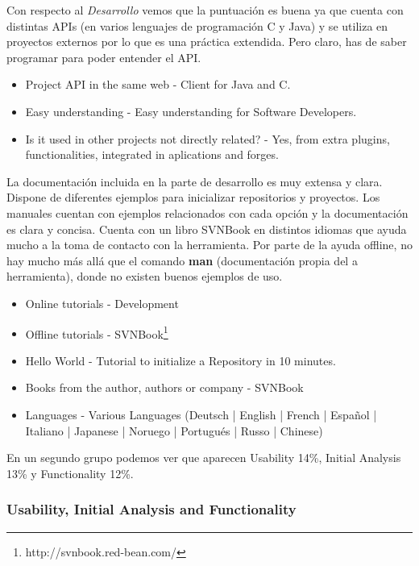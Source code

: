 \documentclass[11pt]{scrartcl}
\begin{document}
\par Con respecto al \emph{Desarrollo} vemos que la puntuaci\'on es buena ya que cuenta con distintas APIs (en varios lenguajes de programaci\'on C y Java) y se utiliza en proyectos externos por lo que es una pr\'actica extendida. Pero claro, has de saber programar para poder entender el API.

\begin{itemize}
    \item Project API in the same web - Client for Java and C.
    \item Easy understanding - Easy understanding for Software Developers. 
    \item Is it used in other projects not directly related? - Yes, from extra plugins, functionalities, integrated in aplications and forges.
\end{itemize}
  
\par La documentaci\'on incluida en la parte de desarrollo es muy extensa y clara. Dispone de diferentes ejemplos para inicializar repositorios y proyectos. Los manuales cuentan con ejemplos relacionados con cada opci\'on y la documentaci\'on es clara y concisa. Cuenta con un libro SVNBook en distintos idiomas que ayuda mucho a la toma de contacto con la herramienta. Por parte de la ayuda offline, no hay mucho m\'as all\'a que el comando \textbf{man} (documentaci\'on propia del a herramienta), donde no existen buenos ejemplos de uso.

\begin{itemize}
    \item Online tutorials - Development
    \item Offline tutorials - SVNBook\footnote{http://svnbook.red-bean.com/}
    \item Hello World - Tutorial to initialize a Repository in 10 minutes.
    \item Books from the author, authors or company -  SVNBook
    \item Languages - Various Languages (Deutsch | English | French | Espa\~nol | Italiano | Japanese | Noruego | Portugu\'es | Russo | Chinese)
\end{itemize}

\par En un segundo grupo podemos ver que aparecen Usability 14\%, Initial Analysis 13\% y Functionality 12\%.

\subsubsection{Usability, Initial Analysis and Functionality}
\end{document}
